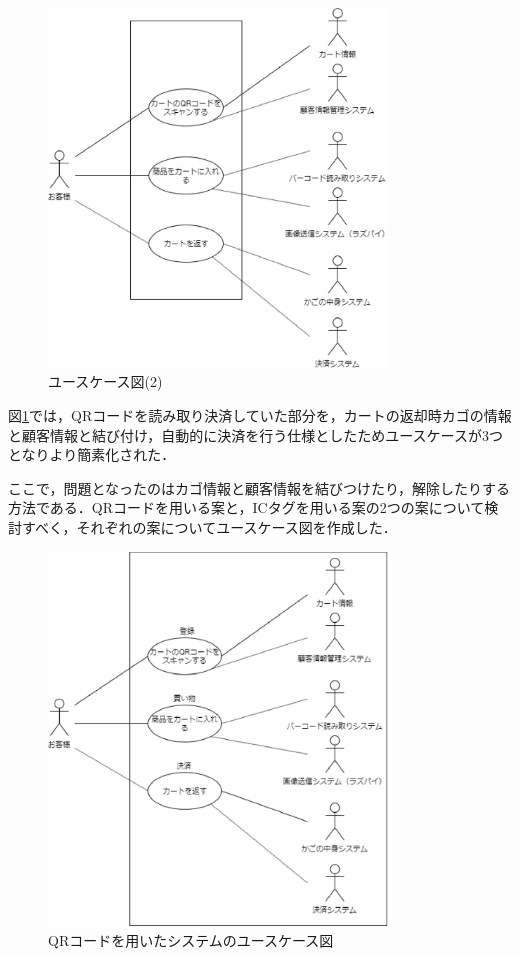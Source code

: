 \begin{figure}[htbp]
\centering
\includegraphics[width = 9cm]{./picture/usecase3.eps}
\caption{ユースケース図(2)}
\label{usecase3}
\end{figure}


図\ref{usecase3}では，QRコードを読み取り決済していた部分を，カートの返却時カゴの情報と顧客情報と結び付け，自動的に決済を行う仕様としたためユースケースが3つとなりより簡素化された．

ここで，問題となったのはカゴ情報と顧客情報を結びつけたり，解除したりする方法である．QRコードを用いる案と，ICタグを用いる案の2つの案について検討すべく，それぞれの案についてユースケース図を作成した．


\begin{figure}[htbp]
\centering
\includegraphics[width = 9cm]{./picture/usecase_qr.eps}
\caption{QRコードを用いたシステムのユースケース図}
\label{usecase_qr}
\end{figure}

